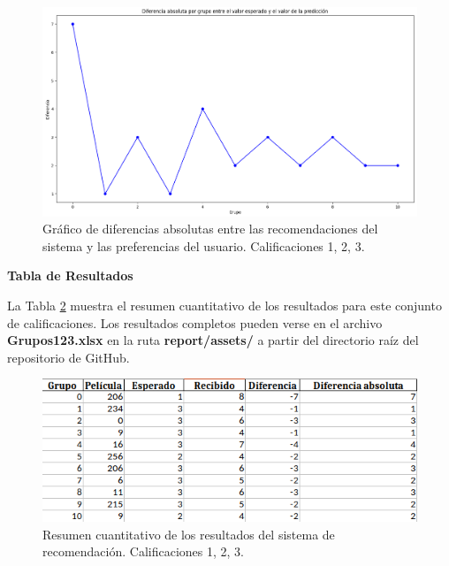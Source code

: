 \documentclass[runningheads,a4paper]{llncs}
\begin{document}
\begin{figure}[h]
    \centering
    \includegraphics[width=\columnwidth]{assets/absolutas123.png}
    \caption{Gráfico de diferencias absolutas entre las recomendaciones del sistema y las preferencias del usuario. Calificaciones 1, 2, 3.}
    \label{fig:absolutas2}
\end{figure}

\textbf{Tabla de Resultados}

La Tabla \ref{tab:resultados2} muestra el resumen cuantitativo de los resultados para este conjunto de calificaciones. Los resultados completos 
pueden verse en el archivo \textbf{Grupos123.xlsx} en la ruta \textbf{report/assets/} a partir del directorio raíz del repositorio de GitHub.

\begin{figure}[h]
    \centering
    \includegraphics[width=\columnwidth]{assets/tabla123.png}
    \caption{Resumen cuantitativo de los resultados del sistema de recomendación. Calificaciones 1, 2, 3.}
    \label{tab:resultados2}
\end{figure}
\end{document}
